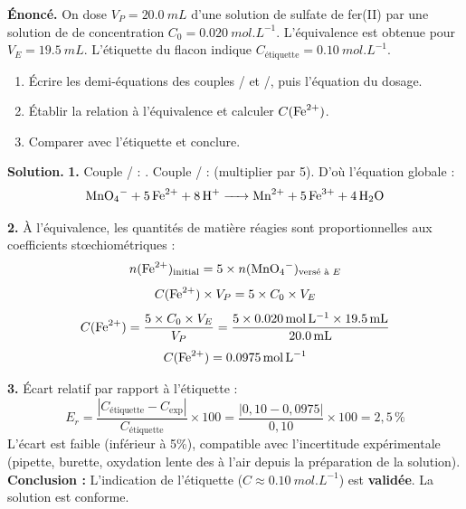 \documentclass[11pt]{article}
\begin{document}
\begin{exoresolu}
\textbf{Énoncé.} On dose $V_P = \SI{20,0}{mL}$ d'une solution de sulfate de fer(II) par une solution de  de concentration $C_0 = \SI{0,020}{mol.L^{-1}}$. L'équivalence est obtenue pour $V_E = \SI{19,5}{mL}$. L'étiquette du flacon indique $C_{\text{étiquette}} = \SI{0,10}{mol.L^{-1}}$.
\begin{enumerate}
\item Écrire les demi-équations des couples / et /, puis l'équation du dosage.
\item Établir la relation à l'équivalence et calculer $C(\ce{Fe^2+})$.
\item Comparer avec l'étiquette et conclure.
\end{enumerate}
\tcblower
\textbf{Solution.}
\textbf{1.} Couple / : .
Couple / :  (multiplier par 5).
D'où l'équation globale :
\[ \ce{MnO4- + 5Fe^2+ + 8H+ -> Mn^2+ + 5Fe^3+ + 4H2O} \]

\textbf{2.} À l'équivalence, les quantités de matière réagies sont proportionnelles aux coefficients stœchiométriques :
\[ n(\ce{Fe^2+})_{\text{initial}} = 5 \times n(\ce{MnO4-})_{\text{versé à }E} \]
\[ C(\ce{Fe^2+}) \times V_P = 5 \times C_0 \times V_E \]
\[ C(\ce{Fe^2+}) = \frac{5 \times C_0 \times V_E}{V_P} = \frac{5 \times \SI{0,020}{mol.L^{-1}} \times \SI{19,5}{mL}}{\SI{20,0}{mL}} \]
\[ C(\ce{Fe^2+}) = \SI{0,0975}{mol.L^{-1}} \]

\textbf{3.} Écart relatif par rapport à l'étiquette :
\[ E_r = \frac{|C_{\text{étiquette}} - C_{\text{exp}}|}{C_{\text{étiquette}}} \times 100 = \frac{|0,10 - 0,0975|}{0,10} \times 100 = 2,5\,\% \]
L'écart est faible (inférieur à 5\%), compatible avec l'incertitude expérimentale (pipette, burette, oxydation lente des  à l'air depuis la préparation de la solution).
\textbf{Conclusion :} L'indication de l'étiquette ($C \approx \SI{0,10}{mol.L^{-1}}$) est \textbf{validée}. La solution est conforme.
\end{exoresolu}
\end{document}
